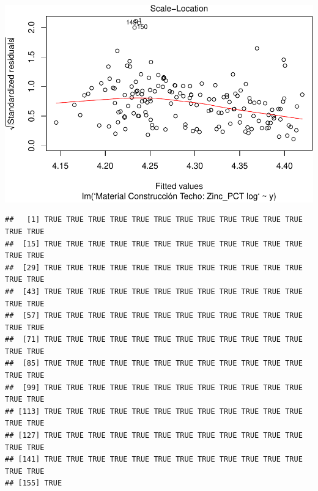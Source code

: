 \documentclass[11pt,]{article}
\newenvironment{Shaded}{\begin{snugshade}}{\end{snugshade}}
\newcommand{\KeywordTok}[1]{\textcolor[rgb]{0.13,0.29,0.53}{\textbf{#1}}}
\newcommand{\DataTypeTok}[1]{\textcolor[rgb]{0.13,0.29,0.53}{#1}}
\newcommand{\DecValTok}[1]{\textcolor[rgb]{0.00,0.00,0.81}{#1}}
\newcommand{\StringTok}[1]{\textcolor[rgb]{0.31,0.60,0.02}{#1}}
\newcommand{\OperatorTok}[1]{\textcolor[rgb]{0.81,0.36,0.00}{\textbf{#1}}}
\newcommand{\NormalTok}[1]{#1}
\begin{document}
\includegraphics{proyecto_files/figure-latex/unnamed-chunk-2-13.pdf}

\begin{Shaded}
\end{Shaded}

\begin{verbatim}
##   [1] TRUE TRUE TRUE TRUE TRUE TRUE TRUE TRUE TRUE TRUE TRUE TRUE TRUE TRUE
##  [15] TRUE TRUE TRUE TRUE TRUE TRUE TRUE TRUE TRUE TRUE TRUE TRUE TRUE TRUE
##  [29] TRUE TRUE TRUE TRUE TRUE TRUE TRUE TRUE TRUE TRUE TRUE TRUE TRUE TRUE
##  [43] TRUE TRUE TRUE TRUE TRUE TRUE TRUE TRUE TRUE TRUE TRUE TRUE TRUE TRUE
##  [57] TRUE TRUE TRUE TRUE TRUE TRUE TRUE TRUE TRUE TRUE TRUE TRUE TRUE TRUE
##  [71] TRUE TRUE TRUE TRUE TRUE TRUE TRUE TRUE TRUE TRUE TRUE TRUE TRUE TRUE
##  [85] TRUE TRUE TRUE TRUE TRUE TRUE TRUE TRUE TRUE TRUE TRUE TRUE TRUE TRUE
##  [99] TRUE TRUE TRUE TRUE TRUE TRUE TRUE TRUE TRUE TRUE TRUE TRUE TRUE TRUE
## [113] TRUE TRUE TRUE TRUE TRUE TRUE TRUE TRUE TRUE TRUE TRUE TRUE TRUE TRUE
## [127] TRUE TRUE TRUE TRUE TRUE TRUE TRUE TRUE TRUE TRUE TRUE TRUE TRUE TRUE
## [141] TRUE TRUE TRUE TRUE TRUE TRUE TRUE TRUE TRUE TRUE TRUE TRUE TRUE TRUE
## [155] TRUE
\end{verbatim}

\begin{Shaded}
\end{Shaded}
\end{document}
